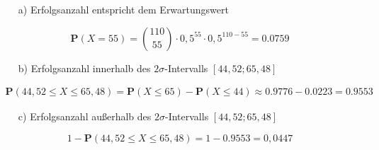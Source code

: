 \documentclass[t,11pt,aspectratio=169]{beamer}
\begin{document}
\begin{frame}

\begin{block}{}
\begin{itemize}
\item[a)] Erfolgsanzahl entspricht dem Erwartungswert 
\end{itemize}
\end{block}
$$\mathbf{P}(X=55) = \binom{110}{55} \cdot 0,5^{55} \cdot 0,5^{110-55} = 0.0759$$

\pause

\begin{block}{}
\begin{itemize}
\item[b)] Erfolgsanzahl innerhalb des $2\sigma$-Intervalls $[ 44,52; 65,48]$
\end{itemize}
\end{block}
\begin{align*}
\mathbf{P}(44,52\leq X \leq 65,48) =  \mathbf{P}(X \leq 65) - \mathbf{P}(X \leq 44) \approx 0.9776- 0.0223= 0.9553 
\end{align*}

\pause

\begin{block}{}
\begin{itemize}
\item[c)] Erfolgsanzahl außerhalb des $2\sigma$-Intervalls  $[ 44,52; 65,48]$
\end{itemize}
\end{block}
$$1-\mathbf{P}(44,52\leq X \leq 65,48) = 1- 0.9553 = 0,0447$$


\end{frame}
\end{document}
